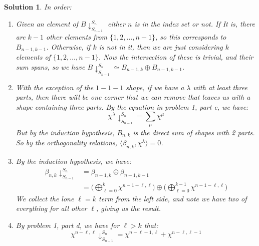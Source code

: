 \documentclass{article}
\theoremstyle{normal}
\theoremstyle{thmit}
\newtheorem*{solution}{Solution}
\begin{document}
\begin{solution}
    In order:
    \begin{enumerate}
        \item
            Given an element of $B\downarrow_{S_{n-1}}^{S_{n}}$ either $n$ is in the index set or not. If
            It is, there are $k-1$ other elements from $\{1,2,\dots,n-1\}$, so this corresponds to
            $B_{n-1,k-1}$. Otherwise, if $k$ is not in it, then we are just considering $k$ elements of
            $\{1,2,\dots,n-1\}$. Now the intersection of these is trivial, and their sum spans, so we have
            $B\downarrow_{S_{n-1}}^{S_{n}}\simeq{B}_{n-1,k}\oplus{B}_{n-1,k-1}$.
        \item
            With the exception of the $1-1-1$ shape, if we have a $\lambda$ with at least three parts,
            then there will be one corner that we can remove that leaves us with a shape containing
            three parts. By the equation in problem 1, part c, we have:
            \begin{equation}
                \chi^{\lambda}\downarrow_{S_{n-1}}^{S_{n}}=\sum_{\mu}\chi^{\mu}
            \end{equation}
            But by the induction hypothesis, $B_{n,k}$ is the direct sum of shapes with 2 parts. So by
            the orthogonality relations, $\langle{\beta_{n,k},\chi^{\lambda}}\rangle=0$.
        \item
            By the induction hypothesis, we have:
            \begin{subequations}
                \begin{align}
                    \beta_{n,k}\downarrow_{S_{n-1}}^{S_{n}}
                    &=\beta_{n-1,k}\oplus\beta_{n-1,k-1}\\
                    &=\Big(\bigoplus_{\ell=0}^{k}\chi^{n-1-\ell,\ell}\Big)
                        \oplus\Big(\bigoplus_{\ell=0}^{k-1}\chi^{n-1-\ell,\ell}\Big)
                \end{align}
            \end{subequations}
            We collect the lone $\ell=k$ term from the left side, and note we have two of everything
            for all other $\ell$, giving us the result.
        \item
            By problem 1, part d, we have for $\ell>k$ that:
            \begin{equation}
                \chi^{n-\ell,\ell}\downarrow_{S_{n-1}}^{S_{n}}
                =\chi^{n-\ell-1,\ell}+\chi^{n-\ell,\ell-1}
            \end{equation}

\end{enumerate}
\end{solution}
\end{document}
